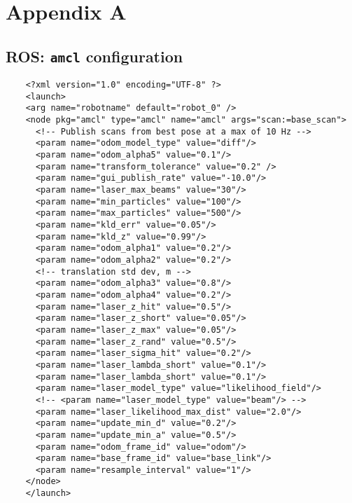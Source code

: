 \section*{Appendix A} \label{app:A}
\subsection*{ROS: \texttt{amcl} configuration}

\begin{lstlisting}
    <?xml version="1.0" encoding="UTF-8" ?>
    <launch>
    <arg name="robotname" default="robot_0" />
    <node pkg="amcl" type="amcl" name="amcl" args="scan:=base_scan">
      <!-- Publish scans from best pose at a max of 10 Hz -->
      <param name="odom_model_type" value="diff"/>
      <param name="odom_alpha5" value="0.1"/>
      <param name="transform_tolerance" value="0.2" />
      <param name="gui_publish_rate" value="-10.0"/>
      <param name="laser_max_beams" value="30"/>
      <param name="min_particles" value="100"/>
      <param name="max_particles" value="500"/>
      <param name="kld_err" value="0.05"/>
      <param name="kld_z" value="0.99"/>
      <param name="odom_alpha1" value="0.2"/>
      <param name="odom_alpha2" value="0.2"/>
      <!-- translation std dev, m -->
      <param name="odom_alpha3" value="0.8"/>
      <param name="odom_alpha4" value="0.2"/>
      <param name="laser_z_hit" value="0.5"/>
      <param name="laser_z_short" value="0.05"/>
      <param name="laser_z_max" value="0.05"/>
      <param name="laser_z_rand" value="0.5"/>
      <param name="laser_sigma_hit" value="0.2"/>
      <param name="laser_lambda_short" value="0.1"/>
      <param name="laser_lambda_short" value="0.1"/>
      <param name="laser_model_type" value="likelihood_field"/>
      <!-- <param name="laser_model_type" value="beam"/> -->
      <param name="laser_likelihood_max_dist" value="2.0"/>
      <param name="update_min_d" value="0.2"/>
      <param name="update_min_a" value="0.5"/>
      <param name="odom_frame_id" value="odom"/>
      <param name="base_frame_id" value="base_link"/>
      <param name="resample_interval" value="1"/>
    </node>
    </launch>
    \end{lstlisting}